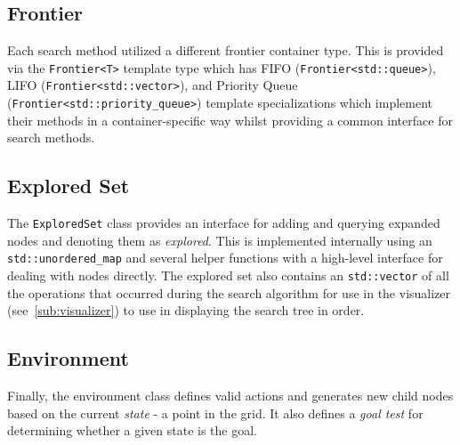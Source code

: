 \subsection{Frontier} %
\label{sub:frontier}
Each search method utilized a different frontier container type. This is provided via the \texttt{Frontier<T>} template type which has FIFO (\texttt{Frontier<std::queue>}), LIFO (\texttt{Frontier<std::vector>}), and Priority Queue (\texttt{Frontier<std::priority_queue>}) template specializations which implement their methods in a container-specific way whilst providing a common interface for search methods.

\subsection{Explored Set} %
\label{sub:exploredset}
The \texttt{ExploredSet} class provides an interface for adding and querying expanded nodes and denoting them as \textit{explored}. This is implemented internally using an \texttt{std::unordered_map} and several helper functions with a high-level interface for dealing with nodes directly. The explored set also contains an \texttt{std::vector} of all the operations that occurred during the search algorithm for use in the visualizer (see~\ref{sub:visualizer}) to use in displaying the search tree in order.

\subsection{Environment} %
\label{sub:environment}
Finally, the environment class defines valid actions and generates new child nodes based on the current \textit{state} - a point in the grid. It also defines a \textit{goal test} for determining whether a given state is the goal.

